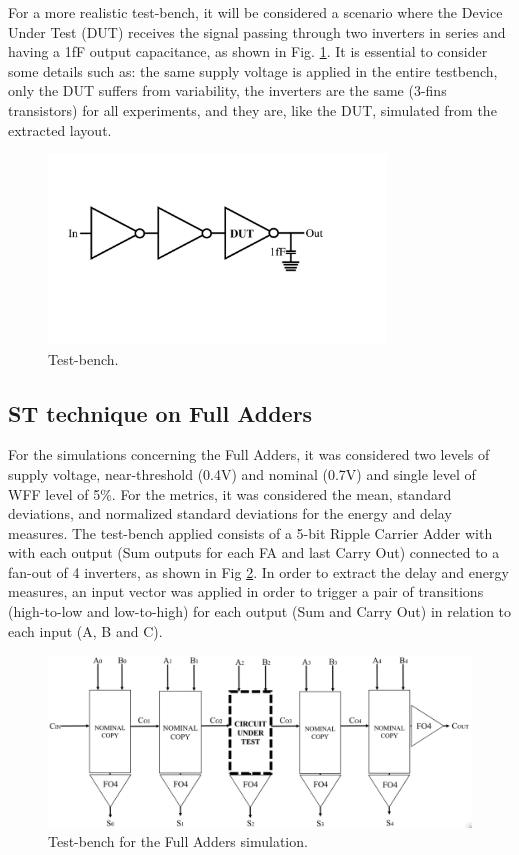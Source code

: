 \documentclass[pgmicro,mestrado,english]{iiufrgs}
\begin{document}
 For a more realistic test-bench, it will be considered a scenario where the Device Under Test (DUT) receives the signal passing through two inverters in series and having a 1fF output capacitance, as shown in Fig. \ref{fig:tbST}. It is essential to consider some details such as: the same supply voltage is applied in the entire testbench, only the DUT suffers from variability, the inverters are the same (3-fins transistors) for all experiments, and they are, like the DUT, simulated from the extracted layout.

\begin{figure}[]
\centering
\includegraphics[width=0.8\textwidth, trim={2cm 7cm 6cm 5cm},clip]{testbench.pdf}
\caption{Test-bench.}
\label{fig:tbST}
\end{figure}

\subsection{ST technique on Full Adders}

For the simulations concerning the Full Adders, it was considered two levels of supply voltage, near-threshold (0.4V) and nominal (0.7V) and single level of WFF level of 5\%. For the metrics, it was considered the mean, standard deviations, and normalized standard deviations for the energy and delay measures. The test-bench applied consists of a 5-bit Ripple Carrier Adder with with each output (Sum outputs for each FA and last Carry Out) connected to a fan-out of 4 inverters, as shown in Fig \ref{fig:tbFA}. In order to extract the delay and energy measures, an input vector was applied in order to trigger a pair of transitions (high-to-low and low-to-high) for each output (Sum and Carry Out) in relation to each input (A, B and C). 

\begin{figure}[]
\centering
\includegraphics[width=\textwidth, trim={0cm 0cm 0cm 0cm},clip]{testbenchFA.png}
\caption{Test-bench for the Full Adders simulation.}
\label{fig:tbFA}
\end{figure}
\end{document}
